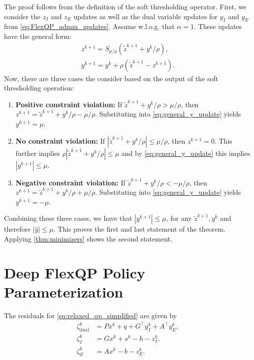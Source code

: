 \documentclass{article} %
\begin{document}
The proof follows from the definition of the soft thresholding operator. First, we consider the $z_I$ and $z_E$ updates as well as the dual variable updates for $y_I$ and $y_E$ from \cref{eq:FlexQP_admm_updates}. Assume w.l.o.g. that $\alpha = 1$. These updates have the general form:
\begin{subequations}
\begin{align}
    z^{k + 1} = S_{\mu / \rho}\left( \tilde{z}^{k + 1} + y^k / \rho \right), \\
    y^{k + 1} = y^k + \rho (\tilde{z}^{k + 1} - z^{k + 1}). \label{eq:general_y_update} 
\end{align}
\end{subequations}
Now, there are three cases the consider based on the output of the soft thresholding operation:
\begin{enumerate}
    \item \textbf{Positive constraint violation:} If $\tilde{z}^{k + 1} + y^k / \rho > \mu / \rho$, then $z^{k + 1} = \tilde{z}^{k + 1} + y^k / \rho - \mu / \rho$. Substituting into \cref{eq:general_y_update} yields $y^{k + 1} = \mu$.
    \item \textbf{No constraint violation:} If $|\tilde{z}^{k + 1} + y^k / \rho| \leq \mu / \rho$, then $z^{k + 1} = 0$. This further implies $\rho |\tilde{z}^{k + 1} + y^k / \rho| \leq \mu$ and by \cref{eq:general_y_update} this implies $|y^{k + 1}| \leq \mu$.
    \item \textbf{Negative constraint violation:} If $\tilde{z}^{k + 1} + y^k / \rho < -\mu / \rho$, then $z^{k + 1} = \tilde{z}^{k + 1} + y^k / \rho + \mu / \rho$. Substituting into \cref{eq:general_y_update} yields $y^{k + 1} = -\mu$.
\end{enumerate}
Combining these three cases, we have that $|y^{k + 1}| \leq \mu$, for any $\tilde{z}^{k + 1}, y^k$ and therefore $|\hat{y}| \leq \mu$. This proves the first and last statement of the theorem. Applying \cref{thm:minimizers} shows the second statement. 


\section{Deep FlexQP Policy Parameterization}
\label{appendix:residuals}

The residuals for \cref{eq:relaxed_qp_simplified} are given by
\begin{subequations} \label{eq:relaxed_qp_residuals}
\begin{align}
    \zeta_\text{dual}^k &= Px^k + q + G^\top y_I^k + A^\top y_E^k, \\
    \zeta_I^k &= Gx^k + s^k - h - z_I^k, \\
    \zeta_E^k &= Ax^k - b - z_E^k.
\end{align}
\end{subequations}
\end{document}
